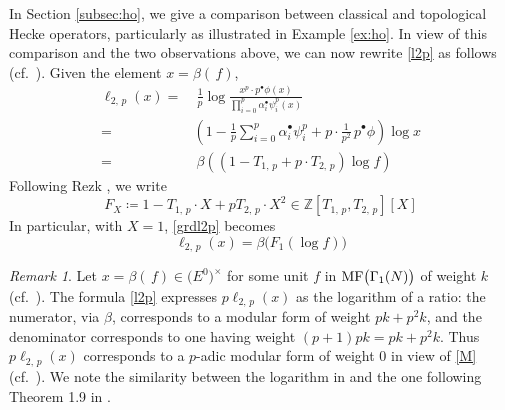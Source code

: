 \documentclass{gtpart}
\theoremstyle{definition}
\theoremstyle{remark}
\newtheorem{rmk}[equation]{Remark}
\newcommand{\mb}[1]{\mathbb{#1}}
\newcommand{\BZ}{{\mb Z}}
\newcommand{\MF}{{\rm MF}}
\newcommand{\A}{\alpha}
\newcommand{\B}{\beta}
\newcommand{\G}{\Gamma}
\newcommand{\ce}{\coloneqq}
\renewcommand{\=}{\approx}
\renewcommand{\-}{\sim}
\numberwithin{equation}{section}
\begin{document}
In Section \ref{subsec:ho}, we give a comparison between classical and 
topological Hecke operators, particularly as illustrated in Example \ref{ex:ho}.  
In view of this comparison and the two observations above, we can now rewrite 
\eqref{l2p} as follows (cf.~\cite[1.12]{log}).  Given the element $x = \B(\,f)$, 
\begin{equation}
 \label{grdl2p}
 \begin{split}
  \ell_{2,\,p}(x) = & ~ \frac{1}{p} \log \frac{x^p \cdot p^\bullet 
                      \phi(x)}{\prod_{i=0}^p \A_i^\bullet \psi^p_i(x)} \\
                  = & \left( 1 - \frac{1}{p} \sum_{i = 0}^p \A_i^\bullet 
                      \psi^p_i + p \cdot \frac{1}{p^2} \, p^\bullet \phi \right) 
                      \log x \\
                  = & ~ \B \left( (1 - T_{1,\,p} + p \cdot T_{2,\,p}) 
                      \log f \right) 
 \end{split}
\end{equation}
Following Rezk \cite[1.12]{log}, we write 
\begin{equation}
 \label{FX}
 F_X \ce 1 - T_{1,\,p} \cdot X + p T_{2,\,p} \cdot X^2 \in 
 \BZ[T_{1,\,p},T_{2,\,p}][X] 
\end{equation}
In particular, with $X = 1$, \eqref{grdl2p} becomes 
\begin{equation}
 \label{F1}
 \ell_{2,\,p}(x) = \B \big( F_1 (\log f) \big) 
\end{equation}

\begin{rmk}
 \label{rmk:ratio}
 Let $x = \B(\,f) \in \big( E^0 \big)^{\!\times}$ for some unit $f$ in 
 $\MF\big(\G_1(N)\big)$ of weight $k$ (cf.~\cite{KubertLang}).  The formula 
 \eqref{l2p} expresses $p \ell_{2,\,p}(x)$ as the logarithm of a ratio: the 
 numerator, via $\B$, corresponds to a modular form of weight $p k + p^2 k$, and 
 the denominator corresponds to one having weight $(p + 1) p k = p k + p^2 k$.  
 Thus $p \ell_{2,\,p}(x)$ corresponds to a $p$-adic modular form of weight 0 in 
 view of \eqref{M} (cf.~\cite[Section 10.1]{padicinterp}).  We note the 
 similarity between the logarithm in \cite[10.2.7]{padicinterp} and the one 
 following Theorem 1.9 in \cite{log}.  
\end{rmk}
\end{document}
